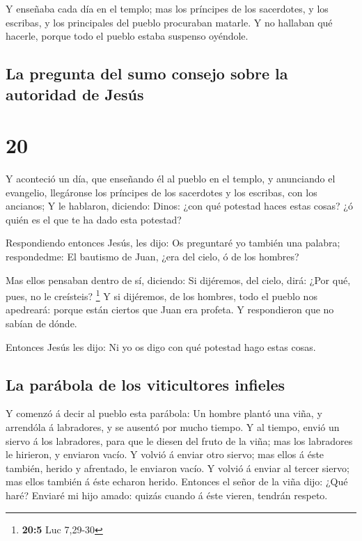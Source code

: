  Y enseñaba cada día en el templo; mas los príncipes de
los sacerdotes, y los escribas, y los principales del pueblo procuraban
matarle.  Y no hallaban qué hacerle, porque todo el
pueblo estaba suspenso oyéndole.

\hypertarget{la-pregunta-del-sumo-consejo-sobre-la-autoridad-de-jesuxfas}{%
\subsection{La pregunta del sumo consejo sobre la autoridad de
Jesús}\label{la-pregunta-del-sumo-consejo-sobre-la-autoridad-de-jesuxfas}}

\hypertarget{section-19}{%
\section{20}\label{section-19}}

 Y aconteció un día, que enseñando él al pueblo en el
templo, y anunciando el evangelio, llegáronse los príncipes de los
sacerdotes y los escribas, con los ancianos;  Y le
hablaron, diciendo: Dinos: ¿con qué potestad haces estas cosas? ¿ó quién
es el que te ha dado esta potestad?

 Respondiendo entonces Jesús, les dijo: Os preguntaré yo
también una palabra; respondedme:  El bautismo de Juan,
¿era del cielo, ó de los hombres?

 Mas ellos pensaban dentro de sí, diciendo: Si dijéremos,
del cielo, dirá: ¿Por qué, pues, no le creísteis? \footnote{\textbf{20:5}
  Luc 7,29-30}  Y si dijéremos, de los hombres, todo el
pueblo nos apedreará: porque están ciertos que Juan era profeta.
 Y respondieron que no sabían de dónde.

 Entonces Jesús les dijo: Ni yo os digo con qué potestad
hago estas cosas.

\hypertarget{la-paruxe1bola-de-los-viticultores-infieles}{%
\subsection{La parábola de los viticultores
infieles}\label{la-paruxe1bola-de-los-viticultores-infieles}}

 Y comenzó á decir al pueblo esta parábola: Un hombre
plantó una viña, y arrendóla á labradores, y se ausentó por mucho
tiempo.  Y al tiempo, envió un siervo á los labradores,
para que le diesen del fruto de la viña; mas los labradores le hirieron,
y enviaron vacío.  Y volvió á enviar otro siervo; mas
ellos á éste también, herido y afrentado, le enviaron vacío.
 Y volvió á enviar al tercer siervo; mas ellos también á
éste echaron herido.  Entonces el señor de la viña dijo:
¿Qué haré? Enviaré mi hijo amado: quizás cuando á éste vieren, tendrán
respeto.

